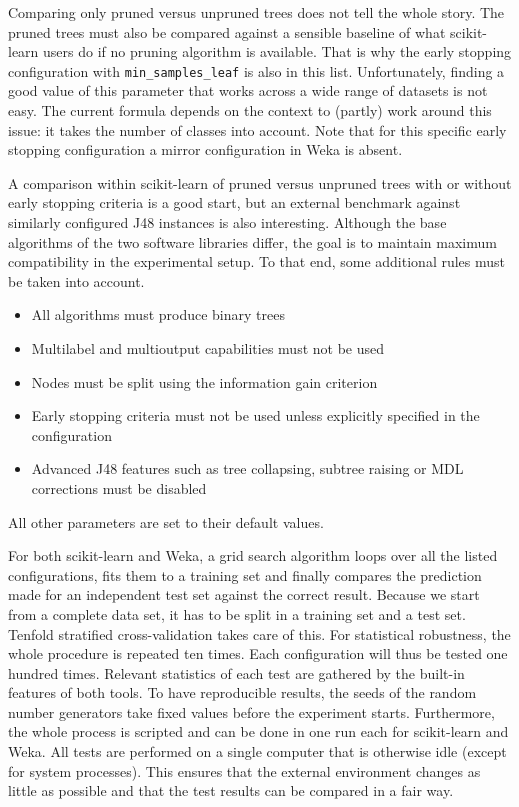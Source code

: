 Comparing only pruned versus unpruned trees does not tell the whole story. The pruned trees must also be compared against a sensible baseline of what scikit-learn users do if no pruning algorithm is available. That is why the early stopping configuration with \texttt{min\_samples\_leaf} is also in this list. Unfortunately, finding a good value of this parameter that works across a wide range of datasets is not easy. The current formula depends on the context to (partly) work around this issue: it takes the number of classes into account. Note that for this specific early stopping configuration a mirror configuration in Weka is absent.

A comparison within scikit-learn of pruned versus unpruned trees with or without early stopping criteria is a good start, but an external benchmark against similarly configured J48 instances is also interesting. Although the base algorithms of the two software libraries differ, the goal is to maintain maximum compatibility in the experimental setup. To that end, some additional rules must be taken into account.

\begin{itemize}
    \item All algorithms must produce binary trees
    \item Multilabel and multioutput capabilities must not be used
    \item Nodes must be split using the information gain criterion
    \item Early stopping criteria must not be used unless explicitly specified in the configuration
    \item Advanced J48 features such as tree collapsing, subtree raising or MDL corrections must be disabled
\end{itemize}

All other parameters are set to their default values.

For both scikit-learn and Weka, a grid search algorithm loops over all the listed configurations, fits them to a training set and finally compares the prediction made for an independent test set against the correct result. Because we start from a complete data set, it has to be split in a training set and a test set. Tenfold stratified cross-validation takes care of this. For statistical robustness, the whole procedure is repeated ten times. Each configuration will thus be tested one hundred times. Relevant statistics of each test are gathered by the built-in features of both tools. To have reproducible results, the seeds of the random number generators take fixed values before the experiment starts. Furthermore, the whole process is scripted and can be done in one run each for scikit-learn and Weka. All tests are performed on a single computer that is otherwise idle (except for system processes). This ensures that the external environment changes as little as possible and that the test results can be compared in a fair way.

